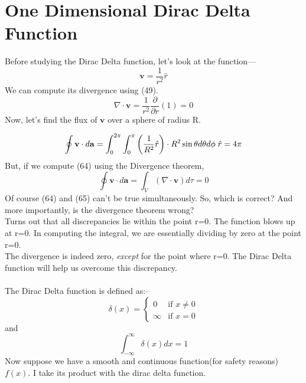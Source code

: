 \documentclass[12pt]{article}
\begin{document}
\section{One Dimensional Dirac Delta Function}
Before studying the Dirac Delta function, let's look at the function---
\begin{equation}
    \mathbf{v}=\frac{1}{r^2}\hat{r}
\end{equation}
We can compute its divergence using (49).
\begin{equation}
    \nabla\cdot\mathbf{v}=\frac{1}{r^2}\frac{\partial}{\partial r}(1)=0
\end{equation}
Now, let's find the flux of $\mathbf{v}$ over a sphere of radius R.

\begin{equation}
    \oint \mathbf{v}\cdot d\mathbf{a}=\int_{0}^{2\pi}\int_{0}^{\pi} \left(\frac{1}{R^2}\hat{r}\right)\cdot R^2 \sin\theta d \theta d\phi\hspace{0.1cm}\hat{r} = 4\pi
\end{equation}
But, if we compute (64) using the Divergence theorem,
\begin{equation}
    \oint \mathbf{v}\cdot d\mathbf{a} = \int_{V}(\nabla\cdot\mathbf{v})d\tau=0
\end{equation}
Of course (64) and (65) can't be true simultaneously. So, which is correct? And more importantly, is the divergence theorem wrong?\\
Turns out that all discrepancies lie within the point r=0. The function blows up at r=0. In computing the integral, we are essentially dividing by zero at the point r=0. \\
The divergence is indeed zero, \textit{except} for the point where r=0. The Dirac Delta function will help us overcome this discrepancy.\\\\
The Dirac Delta function is defined as:--
\begin{equation}
    \delta(x)=\begin{cases}
        0 & \text{if }x\ne 0 \\
        \infty & \text{if }x=0
    \end{cases}
\end{equation}
and
\begin{equation}
    \int_{-\infty}^{\infty}\delta(x)dx=1
\end{equation}
Now suppose we have a smooth and continuous function(for safety reasons) $f(x)$. I take its product with the dirac delta function.\\
\end{document}
